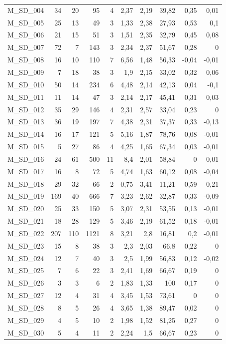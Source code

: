 \begin{table}[htbp]
\begin{tabular}{lrrrrrrrrr}
    M\_SD\_004 & 34   & 20   & 95   & 4    & 2,37 & 2,19 & 39,82 & 0,35 & 0,01 \\
    M\_SD\_005 & 25   & 13   & 49   & 3    & 1,33 & 2,38 & 27,93 & 0,53 & 0,1 \\
    M\_SD\_006 & 21   & 15   & 51   & 3    & 1,51 & 2,35 & 32,79 & 0,45 & 0,08 \\
    M\_SD\_007 & 72   & 7    & 143  & 3    & 2,34 & 2,37 & 51,67 & 0,28 & 0 \\
    M\_SD\_008 & 16   & 10   & 110  & 7    & 6,56 & 1,48 & 56,33 & -0,04 & -0,01 \\
    M\_SD\_009 & 7    & 18   & 38   & 3    & 1,9  & 2,15 & 33,02 & 0,32 & 0,06 \\
    M\_SD\_010 & 50   & 14   & 234  & 6    & 4,48 & 2,14 & 42,13 & 0,04 & -0,1 \\
    M\_SD\_011 & 11   & 14   & 47   & 3    & 2,14 & 2,17 & 45,41 & 0,31 & 0,03 \\
    M\_SD\_012 & 35   & 29   & 146  & 4    & 2,31 & 2,57 & 33,04 & 0,23 & 0 \\
    M\_SD\_013 & 36   & 19   & 197  & 7    & 4,38 & 2,31 & 37,37 & 0,33 & -0,13 \\
    M\_SD\_014 & 16   & 17   & 121  & 5    & 5,16 & 1,87 & 78,76 & 0,08 & -0,01 \\
    M\_SD\_015 & 5    & 27   & 86   & 4    & 4,25 & 1,65 & 67,34 & 0,03 & -0,01 \\
    M\_SD\_016 & 24   & 61   & 500  & 11   & 8,4  & 2,01 & 58,84 & 0    & 0,01 \\
    M\_SD\_017 & 16   & 8    & 72   & 5    & 4,74 & 1,63 & 60,12 & 0,08 & -0,04 \\
    M\_SD\_018 & 29   & 32   & 66   & 2    & 0,75 & 3,41 & 11,21 & 0,59 & 0,21 \\
    M\_SD\_019 & 169  & 40   & 666  & 7    & 3,23 & 2,62 & 32,87 & 0,33 & -0,09 \\
    M\_SD\_020 & 25   & 33   & 150  & 5    & 3,07 & 2,31 & 53,55 & 0,13 & -0,01 \\
    M\_SD\_021 & 18   & 28   & 129  & 5    & 3,46 & 2,19 & 61,52 & 0,18 & -0,01 \\
    M\_SD\_022 & 207  & 110  & 1121 & 8    & 3,21 & 2,8  & 16,81 & 0,2  & -0,01 \\
    M\_SD\_023 & 15   & 8    & 38   & 3    & 2,3  & 2,03 & 66,8 & 0,22 & 0 \\
    M\_SD\_024 & 12   & 7    & 40   & 3    & 2,5  & 1,99 & 56,83 & 0,12 & -0,02 \\
    M\_SD\_025 & 7    & 6    & 22   & 3    & 2,41 & 1,69 & 66,67 & 0,19 & 0 \\
    M\_SD\_026 & 3    & 3    & 6    & 2    & 1,83 & 1,33 & 100  & 0,17 & 0 \\
    M\_SD\_027 & 12   & 4    & 31   & 4    & 3,45 & 1,53 & 73,61 & 0    & 0 \\
    M\_SD\_028 & 8    & 5    & 26   & 4    & 3,65 & 1,38 & 89,47 & 0,02 & 0 \\
    M\_SD\_029 & 4    & 5    & 10   & 2    & 1,98 & 1,52 & 81,25 & 0,27 & 0 \\
    M\_SD\_030 & 5    & 4    & 11   & 2    & 2,24 & 1,5  & 66,67 & 0,23 & 0 \\
    

\end{tabular}
\end{table}
